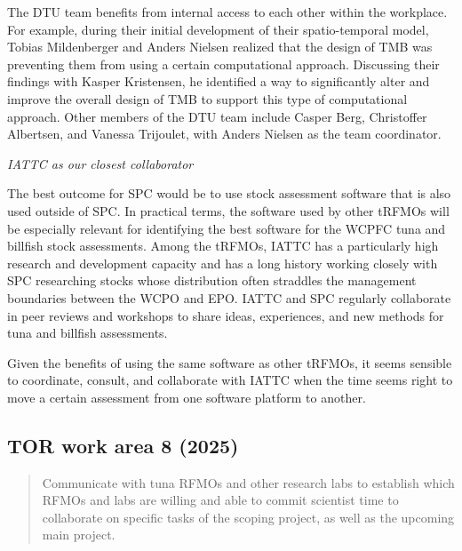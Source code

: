 \documentclass{SCreport}
\begin{document}
\newpage

The DTU team benefits from internal access to each other within the workplace.
For example, during their initial development of their spatio-temporal model,
Tobias Mildenberger and Anders Nielsen realized that the design of TMB was
preventing them from using a certain computational approach. Discussing their
findings with Kasper Kristensen, he identified a way to significantly alter and
improve the overall design of TMB to support this type of computational
approach. Other members of the DTU team include Casper Berg, Christoffer
Albertsen, and Vanessa Trijoulet, with Anders Nielsen as the team coordinator.

\vspace{2ex}

\textit{IATTC as our closest collaborator}

The best outcome for SPC would be to use stock assessment software that is also
used outside of SPC. In practical terms, the software used by other tRFMOs will
be especially relevant for identifying the best software for the WCPFC tuna and
billfish stock assessments. Among the tRFMOs, IATTC has a particularly high
research and development capacity and has a long history working closely with
SPC researching stocks whose distribution often straddles the management
boundaries between the WCPO and EPO. IATTC and SPC regularly collaborate in peer
reviews and workshops to share ideas, experiences, and new methods for tuna and
billfish assessments.

Given the benefits of using the same software as other tRFMOs, it seems sensible
to coordinate, consult, and collaborate with IATTC when the time seems right to
move a certain assessment from one software platform to another.

\vspace{2ex}

\hypertarget{link:tor-8}{}
\subsection{TOR work area 8 (2025)}
\label{sec:tor-8}

\begin{quote}\sf
  Communicate with tuna RFMOs and other research labs to establish which RFMOs
  and labs are willing and able to commit scientist time to collaborate on
  specific tasks of the scoping project, as well as the upcoming main project.
\end{quote}
\end{document}
